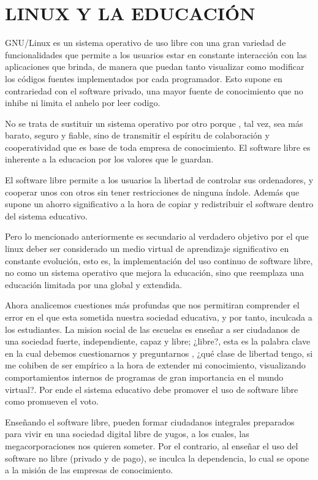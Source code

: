 \chapter*{LINUX Y LA EDUCACIÓN}
GNU/Linux es un sistema operativo de uso libre con una gran
variedad de funcionalidades que permite a los usuarios estar en
constante interacción con las aplicaciones que brinda, de
manera que puedan tanto visualizar como modificar los códigos
fuentes implementados por cada programador. Esto supone en
contrariedad con el software privado, una mayor fuente de
conocimiento que no inhibe ni limita el anhelo por leer codigo.

No se trata de sustituir un sistema operativo por otro porque ,
tal vez, sea más barato, seguro y fiable, sino de transmitir el
espíritu de colaboración y cooperatividad que es base de toda
empresa de conocimiento. El software libre es inherente a la
educacion por los valores que le guardan.

El software libre permite a los usuarios la libertad de controlar
sus ordenadores, y cooperar unos con otros sin tener
restricciones de ninguna índole. Además que supone un ahorro
significativo a la hora de copiar y redistribuir el software dentro
del sistema educativo.

Pero lo mencionado anteriormente es secundario al verdadero
objetivo por el que linux deber ser considerado un medio virtual
de aprendizaje significativo en constante evolución, esto es, la
implementación del uso continuo de software libre, no como un
sistema operativo que mejora la educación, sino que reemplaza
una educación limitada por una global y extendida.

Ahora analicemos cuestiones más profundas que nos permitiran
comprender el error en el que esta sometida nuestra sociedad
educativa, y por tanto, inculcada a los estudiantes.
La mision social de las escuelas es enseñar a ser ciudadanos de
una sociedad fuerte, independiente, capaz y libre; ¿libre?, esta
es la palabra clave en la cual debemos cuestionarnos y
preguntarnos , ¿qué clase de libertad tengo, si me cohiben de
ser empírico a la hora de extender mi conocimiento, visualizando
comportamientos internos de programas de gran importancia en
el mundo virtual?. Por ende el sistema educativo debe promover
el uso de software libre como promueven el voto.
 
Enseñando el software libre, pueden formar ciudadanos
integrales preparados para vivir en una sociedad digital libre de
yugos, a los cuales, las megacorporaciones nos quieren someter.
Por el contrario, al enseñar el uso del software no libre (privado
y de pago), se inculca la dependencia, lo cual se opone a la
misión de las empresas de conocimiento.

